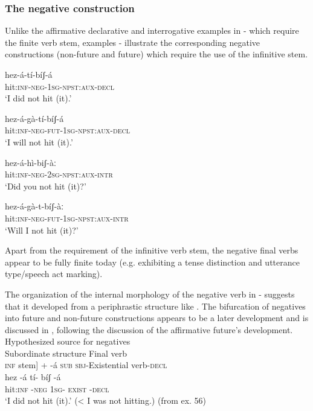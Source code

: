 \documentclass[output=paper]{langsci/langscibook}
\begin{document}
\subsubsection{The negative construction}\label{sec:mahland:3.1.1}

Unlike the affirmative declarative and interrogative examples in - which require the finite verb stem, examples - illustrate the corresponding negative constructions (non-future and future) which require the use of the infinitive stem.

\ea\label{ex:mahland:56}
\gll hez-á-tí-bíʃ-á\\
hit:\textsc{inf-neg-1sg-npst:aux-decl} \\
\glt `I did not hit (it).'
\z

\ea\label{ex:mahland:57}
\gll hez-á-gà-tí-bíʃ-á\\
hit:\textsc{inf-neg-fut-1sg-npst:aux-decl} \\
\glt `I will not hit (it).'
\z

\ea\label{ex:mahland:58}
\gll hez-á-hì-biʃ-àː\\
hit:\textsc{inf-neg-2sg-npst:aux-intr}\\
\glt `Did you not hit (it)?'
\z

\ea\label{ex:mahland:59}
\gll hez-á-gà-t-bíʃ-àː\\
hit:\textsc{inf-neg-fut-1sg-npst:aux-intr}\\
\glt `Will I not hit (it)?'
\z

Apart from the requirement of the infinitive verb stem, the negative final verbs appear to be fully finite today (e.g. exhibiting a tense distinction and utterance type/speech act marking). 

The organization of the internal morphology of the negative verb in - suggests that it developed from a periphrastic structure like . The bifurcation of negatives into future and non-future constructions appears to be a later development and is discussed in , following the discussion of the affirmative future's development.
\ea\label{ex:mahland:60}
Hypothesized source for negatives\\
Subordinate structure        Final verb\\
\textsc{inf} stem] + -á \textsc{sub}               \textsc{sbj}{}-Existential verb-\textsc{decl}\\
\gll  hez                {}-á                 tí-           bíʃ      {}-á    \\
  hit\textsc{:inf}          \textsc{{}-neg}            \textsc{1sg}{}-            \textsc{exist}   \textsc{{}-decl} \\
  \glt `I did not hit (it).' ({\textless} I was not hitting.)  (from ex. 56)
  \z
 
\end{document}

